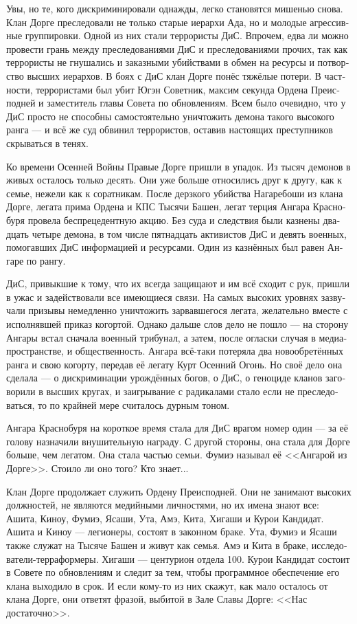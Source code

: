 \documentclass[a4paper,12pt,fleqn]{book}\usepackage{polyglossia}\setdefaultlanguage[babelshorthands=true]{russian}\setotherlanguage{english}\defaultfontfeatures{Ligatures=TeX,Mapping=tex-text}\usepackage{xcolor}\newcommand{\ml}[3]{#2}
\begin{document}
{Увы, но те, кого дискриминировали однажды, легко становятся мишенью снова.
Клан Дорге преследовали не только старые иерархи Ада, но и молодые агрессивные группировки.
Одной из них стали террористы ДиС.
Впрочем, едва ли можно провести грань между преследованиями ДиС и преследованиями прочих, так как террористы не гнушались и заказными убийствами в обмен на ресурсы и потворство высших иерархов.
В боях с ДиС клан Дорге понёс тяжёлые потери.
В частности, террористами был убит Югэн Советник, максим секунда Ордена Преисподней и заместитель главы Совета по обновлениям.
Всем было очевидно, что у ДиС просто не способны самостоятельно уничтожить демона такого высокого ранга --- и всё же суд обвинил террористов, оставив настоящих преступников скрываться в тенях.

Ко времени Осенней Войны Правые Дорге пришли в упадок.
Из тысяч демонов в живых осталось только десять.
Они уже больше относились друг к другу, как к семье, нежели как к соратникам.
После дерзкого убийства Нагаребоши из клана Дорге, легата прима Ордена и КПС Тысячи Башен, легат терция Ангара Краснобуря провела беспрецедентную акцию.
Без суда и следствия были казнены двадцать четыре демона, в том числе пятнадцать активистов ДиС и девять военных, помогавших ДиС информацией и ресурсами.
Один из казнённых был равен Ангаре по рангу.

ДиС, привыкшие к тому, что их всегда защищают и им всё сходит с рук, пришли в ужас и задействовали все имеющиеся связи.
На самых высоких уровнях зазвучали призывы немедленно уничтожить зарвавшегося легата, желательно вместе с исполнявшей приказ когортой.
Однако дальше слов дело не пошло --- на сторону Ангары встал сначала военный трибунал, а затем, после огласки случая в медиапространстве, и общественность.
Ангара всё-таки потеряла два новообретённых ранга и свою когорту, передав её легату Курт Осенний Огонь.
Но своё дело она сделала --- о дискриминации урождённых богов, о ДиС, о геноциде кланов заговорили в высших кругах, и заигрывание с радикалами стало если не преследоваться, то по крайней мере считалось дурным тоном.

Ангара Краснобуря на короткое время стала для ДиС врагом номер один --- за её голову назначили внушительную награду.
С другой стороны, она стала для Дорге больше, чем легатом.
Она стала частью семьи.
Фумиэ называл её <<Ангарой из Дорге>>.
Стоило ли оно того?
Кто знает...

Клан Дорге продолжает служить Ордену Преисподней.
Они не занимают высоких должностей, не являются медийными личностями, но их имена знают все: Ашита, Киноу, Фумиэ, Ясаши, Ута, Амэ, Кита, Хигаши и Курои Кандидат.
Ашита и Киноу --- легионеры, состоят в законном браке. Ута, Фумиэ и Ясаши также служат на Тысяче Башен и живут как семья. Амэ и Кита в браке, исследователи-терраформеры. Хигаши --- центурион отдела 100. Курои Кандидат состоит в Совете по обновлениям и следит за тем, чтобы программное обеспечение его клана выходило в срок. И если кому-то из них скажут, как мало осталось от клана Дорге, они ответят фразой, выбитой в Зале Славы Дорге: <<Нас достаточно>>.

}
\end{document}
